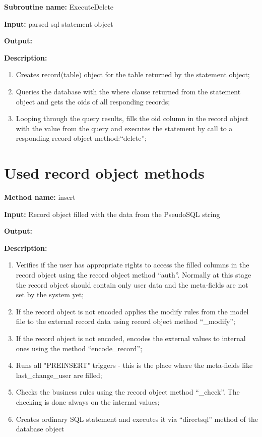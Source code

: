 \textbf{Subroutine name:} ExecuteDelete

\textbf{Input:} parsed sql statement object

\textbf{Output:} 

\textbf{Description: }
\begin{enumerate}
\item Creates record(table) object for the table returned by the statement object; 
\item Queries the database with the where clause returned from the statement object and gets the oids of all responding records;
\item Looping through the query results, fills the oid column in the record object with the value from the query and executes the statement by call to a responding record object method:{}``delete'';

\end{enumerate}


\section{Used record object methods}

\textbf{Method name:} insert 

\textbf{Input:} Record object filled with the data from the PseudoSQL
string 

\textbf{Output:} 

\textbf{Description:} 

\begin{enumerate}
\item Verifies if the user has appropriate rights to access the filled columns
in the record object using the record object method {}``auth''. Normally at this stage the record object should  contain only user data and the meta-fields are not set by the system yet;
\item If the record object is not encoded applies the modify rules from the model file to the external record data using record object method {}``\_modify''; 
\item If the record object is not encoded, encodes the external values to internal ones using the method {}``encode\_record''; 
\item Runs  all "PREINSERT" triggers - this is the place where the meta-fields like last\_change\_user are filled;
\item Checks the business rules using the record object method {}``\_check''. The checking is done always on the internal values; 
\item Creates ordinary SQL statement and executes it via {}``directsql'' method of the database object
\end{enumerate}

